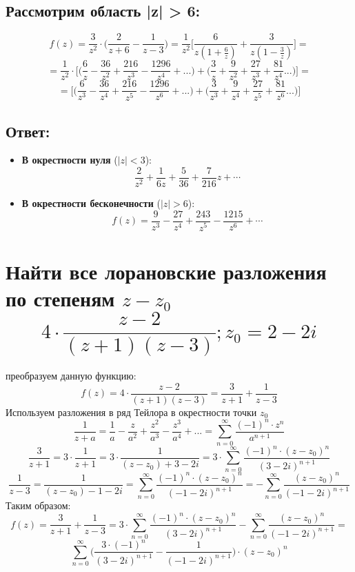 \documentclass[12pt]{article}
\begin{document}
\subsection*{Рассмотрим область |z| > 6:}
$$f(z) = \frac{3}{z^2} \cdot \bigg(\frac{2}{z + 6} - \frac{1}{z - 3}\bigg) = \frac{1}{z^2} \bigg[\frac{6}{z(1 + \frac{6}{z})} + \frac{3}{z(1 - \frac{3}{z})} \bigg] =$$
$$= \frac{1}{z^2} \cdot \bigg[ \bigg(\frac{6}{z} - \frac{36}{z^2} + \frac{216}{z^3} - \frac{1296}{z^4} + ...\bigg) + \bigg(\frac{3}{z} + \frac{9}{z^2} + \frac{27}{z^3} + \frac{81}{z^4} ...\bigg) \bigg] =$$
$$= \bigg[ \bigg(\frac{6}{z^3} - \frac{36}{z^4} + \frac{216}{z^5} - \frac{1296}{z^6} + ...\bigg) + \bigg(\frac{3}{z^3} + \frac{9}{z^4} + \frac{27}{z^5} + \frac{81}{z^6} ...\bigg) \bigg]$$

\subsection*{Ответ:}
\begin{itemize}
\item \textbf{В окрестности нуля} ($|z| < 3$):
$$\frac{2}{z^2} + \frac{1}{6z} + \frac{5}{36} + \frac{7}{216}z + \cdots$$
\item \textbf{В окрестности бесконечности} ($|z| > 6$):
$$f(z) = \frac{9}{z^3} - \frac{27}{z^4} + \frac{243}{z^5} - \frac{1215}{z^6} + \cdots$$
\end{itemize}

\section{Найти все лорановские разложения по степеням $z - z_0$ $$4 \cdot \frac{z - 2}{(z + 1)(z - 3)}; z_0 = 2 - 2i$$}
преобразуем данную функцию:
$$f(z) = 4 \cdot \frac{z-2}{(z+1)(z-3)} = \frac{3}{z+1} + \frac{1}{z-3}$$
Используем разложения в ряд Тейлора в окрестности точки $z_0$ 
$$\frac{1}{z+a} = \frac{1}{a} - \frac{z}{a^2} + \frac{z^2}{a^3} - \frac{z^3}{a^4} + ... = \sum_{n=0}^{\infty} \frac{(-1)^n \cdot z^n}{a^{n+1}}$$
$$\frac{3}{z+1} = 3 \cdot \frac{1}{z+1} = 3 \cdot \frac{1}{(z-z_0) + 3 - 2i} = 3 \cdot \sum_{n=0}^{\infty} \frac{(-1)^n \cdot (z-z_0)^n}{(3 - 2i)^{n+1}}$$
$$\frac{1}{z-3} = \frac{1}{(z-z_0) - 1 - 2i} = \sum_{n=0}^{\infty} \frac{(-1)^n \cdot (z-z_0)^n}{(-1 - 2i)^{n+1}} = -\sum_{n=0}^{\infty} \frac{(z-z_0)^n}{(-1 - 2i)^{n+1}}$$
Таким образом:
$$f(z) = \frac{3}{z+1} + \frac{1}{z-3} = 3 \cdot \sum_{n=0}^{\infty} \frac{(-1)^n \cdot (z-z_0)^n}{(3 - 2i)^{n+1}} -\sum_{n=0}^{\infty} \frac{(z-z_0)^n}{(-1 - 2i)^{n+1}} =$$
$$ \sum_{n=0}^{\infty} \bigg( \frac{3 \cdot (-1)^n}{(3 - 2i)^{n+1}} - \frac{1}{(-1 - 2i)^{n+1}} \bigg) \cdot (z-z_0)^n$$
\end{document}
